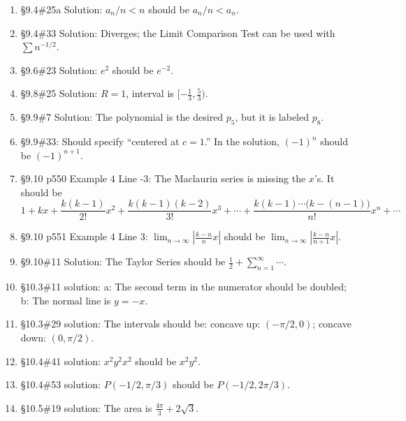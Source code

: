 \documentclass{amsart}
\newcommand{\ds}{\displaystyle}
\newcommand{\abs}[1]{\left\lvert#1\right\rvert}
\begin{document}
\begin{enumerate}
\item \S9.4\#25a Solution: $a_n/n<n$ should be $a_n/n<a_n$.
\item \S9.4\#33 Solution: Diverges; the Limit Comparison Test can be used with $\sum n^{-1/2}$.
\item \S9.6\#23 Solution: $e^2$ should be $e^{-2}$.
\item \S9.8\#25 Solution: $R=1$, interval is $[-\frac13,\frac53)$.
\item \S9.9\#7 Solution: The polynomial is the desired $p_5$, but it is labeled $p_8$.
\item \S9.9\#33: Should specify ``centered at $c=1$.''  In the solution, $(-1)^n$ should be $(-1)^{n+1}$.
\item \S9.10 p550 Example 4 Line -3: The Maclaurin series is missing the $x$'s.  It should be
\[
1+ kx + \frac{k(k-1)}{2!}x^2 + \frac{k(k-1)(k-2)}{3!}x^3 + \dotsb + \frac{k(k-1)\dotsm\big(k-(n-1)\big)}{n!}x^n+\dotsb
\]
\item \S9.10 p551 Example 4 Line 3: $\ds\lim_{n\to\infty} \abs{\frac{k-n}{n}x}$ should be $\ds\lim_{n\to\infty} \abs{\frac{k-n}{n+1}x}$.
\item \S9.10\#11 Solution: The Taylor Series should be $\frac12+\sum_{n=1}^\infty\dotsb$.
\item \S10.3\#11 solution: a: The second term in the numerator should be doubled; b: The normal line is $y=-x$.
\item \S10.3\#29 solution: The intervals should be: concave up: $(-\pi/2,0)$; concave down: $(0,\pi/2)$.
\item \S10.4\#41 solution: $x^2y^2x^2$ should be $x^2y^2$.
\item \S10.4\#53 solution: $P(-1/2,\pi/3)$ should be $P(-1/2,2\pi/3)$.
\item \S10.5\#19 solution: The area is $\frac{4\pi}{3}+2\sqrt 3$.
\label{2017-07IIplus}
\end{enumerate}


\end{document}
